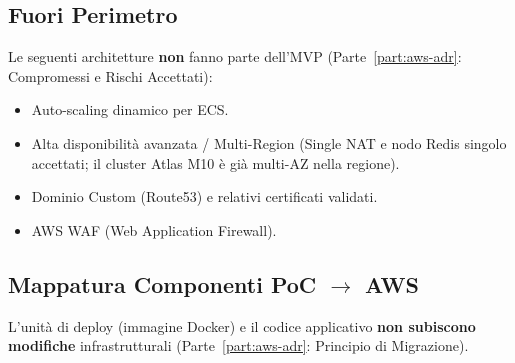 \documentclass[11pt,a4paper]{article}
\begin{document}
\subsection{Fuori Perimetro}

Le seguenti architetture \textbf{non} fanno parte dell'MVP (Parte~\ref{part:aws-adr}: Compromessi e Rischi Accettati):

\begin{itemize}
    \item Auto-scaling dinamico per ECS.
    \item Alta disponibilità avanzata / Multi-Region (Single NAT e nodo Redis singolo accettati; il cluster Atlas M10 è già multi-AZ nella regione).
    \item Dominio Custom (Route53) e relativi certificati validati.
    \item AWS WAF (Web Application Firewall).
\end{itemize}

\subsection{Mappatura Componenti PoC $\to$ AWS}

L'unità di deploy (immagine Docker) e il codice applicativo \textbf{non subiscono modifiche} infrastrutturali (Parte~\ref{part:aws-adr}: Principio di Migrazione).
\end{document}
